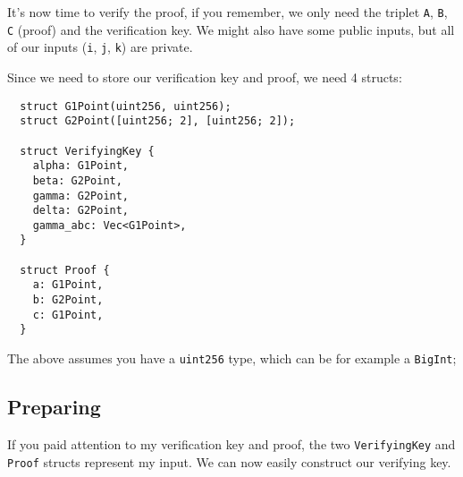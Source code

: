 \documentclass{article}
\begin{document}
It's now time to verify the proof, if you remember, we only need the triplet \texttt{A}, \texttt{B}, \texttt{C} (proof) and the verification key. We might also have some public inputs, but all of our inputs (\texttt{i}, \texttt{j}, \texttt{k}) are private.

Since we need to store our verification key and proof, we need 4 structs:

\begin{lstlisting}
  struct G1Point(uint256, uint256);
  struct G2Point([uint256; 2], [uint256; 2]);

  struct VerifyingKey {
    alpha: G1Point,
    beta: G2Point,
    gamma: G2Point,
    delta: G2Point,
    gamma_abc: Vec<G1Point>,
  }

  struct Proof {
    a: G1Point,
    b: G2Point,
    c: G1Point,
  }
\end{lstlisting}

The above assumes you have a \texttt{uint256} type, which can be for example a \texttt{BigInt};

\subsection{Preparing}

If you paid attention to my verification key and proof, the two \texttt{VerifyingKey} and \texttt{Proof} structs represent my input. We can now easily construct our verifying key.
\end{document}
